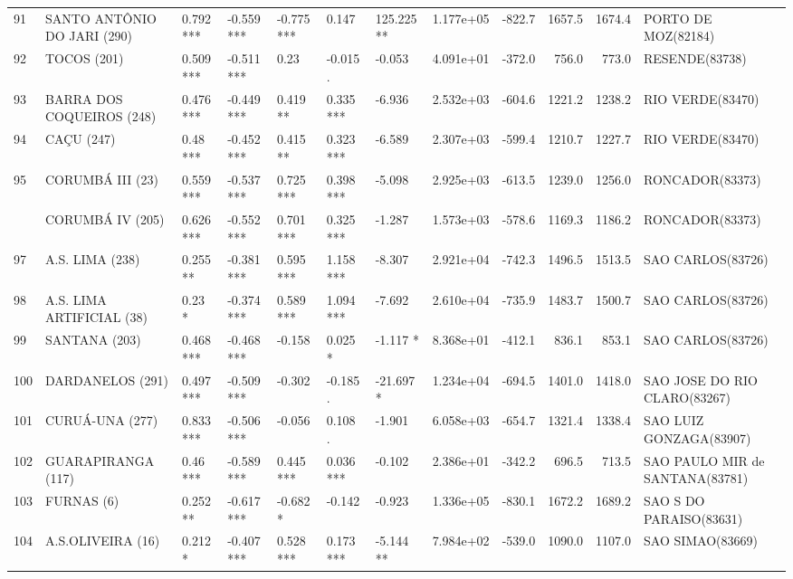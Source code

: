 \documentclass[12pt,oneside]{book}\usepackage[]{graphicx}\usepackage[]{color}
\newenvironment{knitrout}{}{} %
\theoremstyle{definition} %
\begin{document}
\begin{knitrout}
\begin{landscape}
\begin{table}
{\begin{tabular}[t]{lllllllrrrrl}
\addlinespace
\rowcolor{gray!6}  91 & SANTO ANTÔNIO DO JARI (290) & 0.792 *** & -0.559 *** & -0.775 *** & 0.147 & 125.225 ** & 1.177e+05 & -822.7 & 1657.5 & 1674.4 & PORTO DE MOZ(82184)\\
92 & TOCOS (201) & 0.509 *** & -0.511 *** & 0.23 & -0.015 . & -0.053 & 4.091e+01 & -372.0 & 756.0 & 773.0 & RESENDE(83738)\\
\rowcolor{gray!6}  93 & BARRA DOS COQUEIROS (248) & 0.476 *** & -0.449 *** & 0.419 ** & 0.335 *** & -6.936 & 2.532e+03 & -604.6 & 1221.2 & 1238.2 & RIO VERDE(83470)\\
94 & CAÇU (247) & 0.48 *** & -0.452 *** & 0.415 ** & 0.323 *** & -6.589 & 2.307e+03 & -599.4 & 1210.7 & 1227.7 & RIO VERDE(83470)\\
\rowcolor{gray!6}  95 & CORUMBÁ III (23) & 0.559 *** & -0.537 *** & 0.725 *** & 0.398 *** & -5.098 & 2.925e+03 & -613.5 & 1239.0 & 1256.0 & RONCADOR(83373)\\
\addlinespace
96 & CORUMBÁ IV (205) & 0.626 *** & -0.552 *** & 0.701 *** & 0.325 *** & -1.287 & 1.573e+03 & -578.6 & 1169.3 & 1186.2 & RONCADOR(83373)\\
\rowcolor{gray!6}  97 & A.S. LIMA (238) & 0.255 ** & -0.381 *** & 0.595 *** & 1.158 *** & -8.307 & 2.921e+04 & -742.3 & 1496.5 & 1513.5 & SAO CARLOS(83726)\\
98 & A.S. LIMA ARTIFICIAL (38) & 0.23 * & -0.374 *** & 0.589 *** & 1.094 *** & -7.692 & 2.610e+04 & -735.9 & 1483.7 & 1500.7 & SAO CARLOS(83726)\\
\rowcolor{gray!6}  99 & SANTANA (203) & 0.468 *** & -0.468 *** & -0.158 & 0.025 * & -1.117 * & 8.368e+01 & -412.1 & 836.1 & 853.1 & SAO CARLOS(83726)\\
100 & DARDANELOS (291) & 0.497 *** & -0.509 *** & -0.302 & -0.185 . & -21.697 * & 1.234e+04 & -694.5 & 1401.0 & 1418.0 & SAO JOSE DO RIO CLARO(83267)\\
\addlinespace
\rowcolor{gray!6}  101 & CURUÁ-UNA (277) & 0.833 *** & -0.506 *** & -0.056 & 0.108 . & -1.901 & 6.058e+03 & -654.7 & 1321.4 & 1338.4 & SAO LUIZ GONZAGA(83907)\\
102 & GUARAPIRANGA (117) & 0.46 *** & -0.589 *** & 0.445 *** & 0.036 *** & -0.102 & 2.386e+01 & -342.2 & 696.5 & 713.5 & SAO PAULO MIR de SANTANA(83781)\\
\rowcolor{gray!6}  103 & FURNAS (6) & 0.252 ** & -0.617 *** & -0.682 * & -0.142 & -0.923 & 1.336e+05 & -830.1 & 1672.2 & 1689.2 & SAO S DO PARAISO(83631)\\
104 & A.S.OLIVEIRA (16) & 0.212 * & -0.407 *** & 0.528 *** & 0.173 *** & -5.144 ** & 7.984e+02 & -539.0 & 1090.0 & 1107.0 & SAO SIMAO(83669)\\

\end{tabular}}
\end{table}
\end{landscape}
\end{knitrout}
\end{document}
